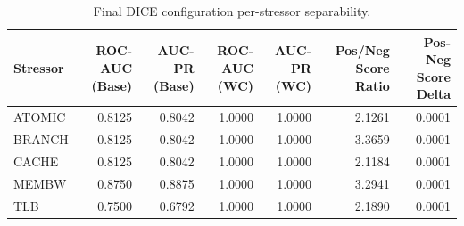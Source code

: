\begin{table}[t]
\centering
\caption{Final DICE configuration per-stressor separability.}
\label{tab:dice_full_stressor}
\footnotesize
\begin{tabular}{lrrrrrr}
\toprule
Stressor & ROC-AUC (Base) & AUC-PR (Base) & ROC-AUC (WC) & AUC-PR (WC) & Pos/Neg Score Ratio & Pos-Neg Score Delta \\
\midrule
ATOMIC & 0.8125 & 0.8042 & 1.0000 & 1.0000 & 2.1261 & 0.0001 \\
BRANCH & 0.8125 & 0.8042 & 1.0000 & 1.0000 & 3.3659 & 0.0001 \\
CACHE & 0.8125 & 0.8042 & 1.0000 & 1.0000 & 2.1184 & 0.0001 \\
MEMBW & 0.8750 & 0.8875 & 1.0000 & 1.0000 & 3.2941 & 0.0001 \\
TLB & 0.7500 & 0.6792 & 1.0000 & 1.0000 & 2.1890 & 0.0001 \\
\bottomrule
\end{tabular}

\end{table}
